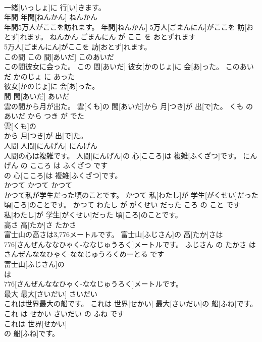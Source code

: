 \documentclass[8pt]{extreport}
\begin{document}
\begin{CJK}{UTF8}{min}
\\	一緒[いっしょ]に 行[い]きます。			
\\	年間	年間[ねんかん]	ねんかん	
\\	年間5万人がここを訪れます。	年間[ねんかん] 5万人[ごまんにん]がここを 訪[おとず]れます。	ねんかん ごまんにん が ここ を おとずれます	
\\	5万人[ごまんにん]がここを 訪[おとず]れます。			
\\	この間	この 間[あいだ]	このあいだ	
\\	この間彼女に会った。	この 間[あいだ] 彼女[かのじょ]に 会[あ]った。	このあいだ かのじょ に あった	
\\	彼女[かのじょ]に 会[あ]った。			
\\	間	間[あいだ]	あいだ	
\\	雲の間から月が出た。	雲[くも]の 間[あいだ]から 月[つき]が 出[で]た。	くも の あいだ から つき が でた	
\\	雲[くも]の
\\	から 月[つき]が 出[で]た。			
\\	人間	人間[にんげん]	にんげん	
\\	人間の心は複雑です。	人間[にんげん]の 心[こころ]は 複雑[ふくざつ]です。	にんげん の こころ は ふくざつ です	
\\	の 心[こころ]は 複雑[ふくざつ]です。			
\\	かつて	かつて	かつて	
\\	かつて私が学生だった頃のことです。	かつて 私[わたし]が 学生[がくせい]だった 頃[ころ]のことです。	かつて わたし が がくせい だった ころ の こと です	
\\	私[わたし]が 学生[がくせい]だった 頃[ころ]のことです。			
\\	高さ	高[たか]さ	たかさ	
\\	富士山の高さは3,776メートルです。	富士山[ふじさん]の 高[たか]さは 
\\	776[さんぜんななひゃく-ななじゅうろく]メートルです。	ふじさん の たかさ は さんぜんななひゃく-ななじゅうろくめーとる です	
\\	富士山[ふじさん]の
\\	は 
\\	776[さんぜんななひゃく-ななじゅうろく]メートルです。			
\\	最大	最大[さいだい]	さいだい	
\\	これは世界最大の船です。	これは 世界[せかい] 最大[さいだい]の 船[ふね]です。	これ は せかい さいだい の ふね です	
\\	これは 世界[せかい]
\\	の 船[ふね]です。			

\end{CJK}
\end{document}
